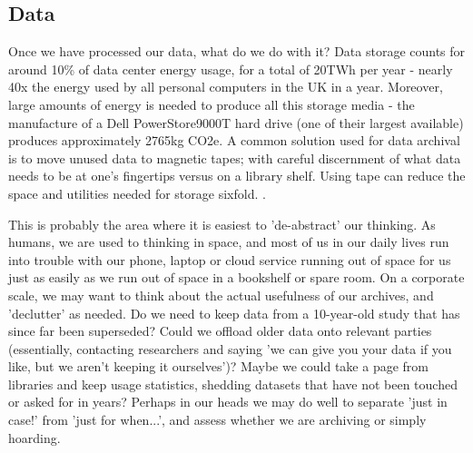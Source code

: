 \documentclass{article}
\begin{document}
\subsection{Data}
Once we have processed our data, what do we do with it? Data storage counts for around 10\% of data center energy usage, for a total of 20TWh per year \citep{shehabi2016united} - nearly 40x the energy used by all personal computers in the UK in a year.  \citep{waters2019energy} Moreover, large amounts of energy is needed to produce all this storage media - the manufacture of a Dell PowerStore9000T hard drive (one of their largest available) produces approximately 2765kg CO2e. \citep{dell2021powerstore} A common solution used for data archival is to move unused data to magnetic tapes; with careful discernment of what data needs to be at one's fingertips versus on a library shelf. Using tape can reduce the space and utilities needed for storage sixfold. \citep{moore2007disk}. \newline

This is probably the area where it is easiest to 'de-abstract' our thinking. As humans, we are used to thinking in space, and most of us in our daily lives run into trouble with our phone, laptop or cloud service running out of space for us just as easily as we run out of space in a bookshelf or spare room. On a corporate scale, we may want to think about the actual usefulness of our archives, and 'declutter' as needed. Do we need to keep data from a 10-year-old study that has since far been superseded? Could we offload older data onto relevant parties (essentially, contacting researchers and saying 'we can give you your data if you like, but we aren't keeping it ourselves')? Maybe we could take a page from libraries and keep usage statistics, shedding datasets that have not been touched or asked for in years? Perhaps in our heads we may do well to separate 'just in case!' from 'just for when...', and assess whether we are archiving or simply hoarding.
\end{document}
